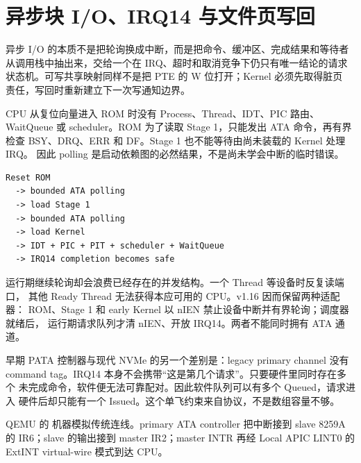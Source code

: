 \section{异步块 I/O、IRQ14 与文件页写回}

\begin{keyidea}
异步 I/O 的本质不是把轮询换成中断，而是把命令、缓冲区、完成结果和等待者
从调用栈中抽出来，交给一个在 IRQ、超时和取消竞争下仍只有唯一结论的请求
状态机。可写共享映射同样不是把 PTE 的 W 位打开；Kernel 必须先取得脏页
责任，写回时重新建立下一次写通知边界。
\end{keyidea}

CPU 从复位向量进入 ROM 时没有 Process、Thread、IDT、PIC 路由、WaitQueue
或 scheduler。ROM 为了读取 Stage 1，只能发出 ATA 命令，再有界检查
BSY、DRQ、ERR 和 DF。Stage 1 也不能等待由尚未装载的 Kernel 处理 IRQ。
因此 polling 是启动依赖图的必然结果，不是尚未学会中断的临时错误。

\begin{lstlisting}
Reset ROM
  -> bounded ATA polling
  -> load Stage 1
  -> bounded ATA polling
  -> load Kernel
  -> IDT + PIC + PIT + scheduler + WaitQueue
  -> IRQ14 completion becomes safe
\end{lstlisting}

运行期继续轮询却会浪费已经存在的并发结构。一个 Thread 等设备时反复读端口，
其他 Ready Thread 无法获得本应可用的 CPU。v1.16 因而保留两种适配器：
ROM、Stage 1 和 early Kernel 以 nIEN 禁止设备中断并有界轮询；调度器就绪后，
运行期请求队列才清 nIEN、开放 IRQ14。两者不能同时拥有 ATA 通道。

早期 PATA 控制器与现代 NVMe 的另一个差别是：legacy primary channel 没有
command tag。IRQ14 本身不会携带“这是第几个请求”。只要硬件里同时存在多个
未完成命令，软件便无法可靠配对。因此软件队列可以有多个 Queued，请求进入
硬件后却只能有一个 Issued。这个单飞约束来自协议，不是数组容量不够。

QEMU 的  机器模拟传统连线。primary ATA controller 把中断接到
slave 8259A 的 IR6；slave 的输出接到 master IR2；master INTR 再经 Local
APIC LINT0 的 ExtINT virtual-wire 模式到达 CPU。

